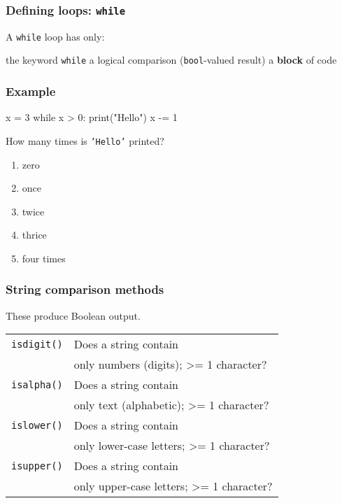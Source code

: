 \documentclass[11pt]{beamer}
\begin{document}
\begin{frame}[fragile]
  \frametitle{Defining loops:  \texttt{while}}
  \Enlarge

  \begin{itemize}
  \myitem  A \texttt{while} loop has only:
    \begin{itemize}
    \mysubitem  the keyword \texttt{while}
    \mysubitem  a logical comparison (\texttt{bool}-valued result)
    \mysubitem  a \textbf{block} of code
    \end{itemize}
  \end{itemize}
\end{frame}

\begin{frame}[fragile]
  \frametitle{Example}
  \Enlarge

  \begin{semiverbatim}
x = 3
while x > 0:
    print("Hello")
    x -= 1
  \end{semiverbatim}
  How many times is \texttt{'Hello'} printed?
  \begin{enumerate}[label=\Alph*]
  \item  zero
  \item  once
  \item  twice
  \item  thrice
  \item  four times
  \end{enumerate}
\end{frame}

\begin{frame}[fragile]
  \frametitle{String comparison methods}
  \Enlarge

  \begin{itemize}
  \myitem  These produce Boolean output.
    \begin{tabular}{ll}
    \texttt{isdigit()} & Does a string contain \\
    & only numbers (digits); >= 1 character?\\
    \texttt{isalpha()} & Does a string contain \\
    & only text (alphabetic); >= 1 character? \\
    \texttt{islower()} & Does a string contain \\
    & only lower-case letters; >= 1 character? \\
    \texttt{isupper()} & Does a string contain \\
    & only upper-case letters; >= 1 character?
    \end{tabular}
  \end{itemize}
\end{frame}
\end{document}
